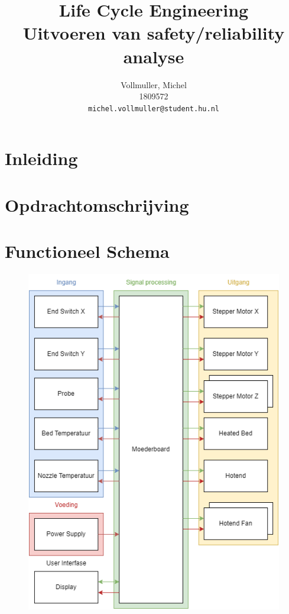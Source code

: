 \documentclass{article}
\title{
    Life Cycle Engineering \\
    \large Uitvoeren van safety/reliability analyse}
\author{
  Vollmuller, Michel\\
  1809572\\
  \texttt{michel.vollmuller@student.hu.nl}
}
\begin{document}
\maketitle


\tableofcontents

\newpage
\section{Inleiding}


\newpage
\section{Opdrachtomschrijving}



\newpage
\section{Functioneel Schema}

\begin{figure}[H]
  \centering
  \includegraphics[width=\textwidth]{Creality Ender V2.drawio.png}
\end{figure}
\end{document}
